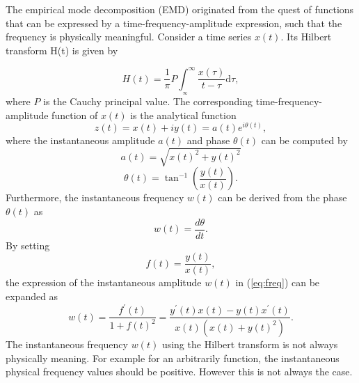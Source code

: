 \documentclass[11pt, oneside]{article}   	%
\begin{document}
\begin{flushleft}
The empirical mode decomposition (EMD) originated from the quest of functions that can be expressed by a time-frequency-amplitude expression, such that the frequency is physically meaningful.
Consider a time series $x(t)$. Its Hilbert transform H(t) is given by 

\begin{equation}
H(t) = \frac{1}{\pi}P\int_{_\infty}^{\infty}\frac{x(\tau)}{t-\tau}\mathrm{d}\tau,
\end{equation}
where $P$ is the Cauchy principal value. The corresponding time-frequency-amplitude function of $x(t)$ is the analytical function
\begin{equation}
z(t) = x(t) + iy(t) = a(t)e^{i\theta(t)},
\end{equation}
where the instantaneous amplitude $a(t)$ and phase $\theta(t)$ can be computed by 
\begin{equation}\label{eq:amp}
a(t) = \sqrt{x(t)^{2}+ y(t)^{2}}
\end{equation}
\begin{equation}
\theta(t) = \tan^{-1}\left(\frac{y(t)}{x(t)}\right).
\end{equation}
Furthermore, the instantaneous frequency $w(t)$ can be derived from the phase $\theta(t)$ as
\begin{equation}\label{eq:freq}
w(t) = \frac{d\theta}{dt}.
\end{equation}
By setting 
\begin{equation}
f(t) = \frac{y(t)}{x(t)}, \nonumber
\end{equation}
the expression of the instantaneous  amplitude $w(t)$ in (\ref{eq:freq}) can be expanded as
\begin{equation}
w(t) = \frac{f^{\prime}(t)}{1+f(t)^{2}} = \frac{y^{\prime}(t)x(t)-y(t)x^{\prime}(t)}{x(t)(x(t)+y(t)^{2})}.
\end{equation}
The instantaneous frequency $w(t)$ using the Hilbert transform is not always physically meaning. For example for an arbitrarily function, the instantaneous physical frequency values should be positive. However this is not always the case. 


\end{flushleft}
\end{document}
